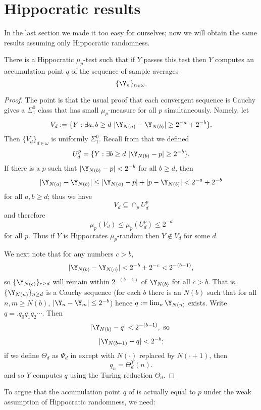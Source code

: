 \section{Hippocratic results}

In the last section we made it too easy for ourselves; now we will obtain the same results assuming only Hippocratic randomness. 

\begin{theorem}\label{Hippo}
There is a Hippocratic $\mu_p$-test such that if $Y$ passes this test then $Y$ computes an accumulation point $q$ of the sequence of sample averages 
\[
\{\Y_n\}_{n\in\omega}.
\] 
\end{theorem}

\begin{proof}
The point is that the usual proof that each convergent sequence is Cauchy gives a $\Sigma^0_1$ class that has small $\mu_p$-measure for all $p$ simultaneously. Namely, let
\[
V_d:=\{Y: \exists a,b\ge d\,\,|\Y_{N(a)}-\Y_{N(b)}|\ge 2^{-a}+ 2^{-b}\}.
\]
Then $\{V_d\}_{d\in\omega}$ is uniformly $\Sigma^0_1$. Recall from  that we defined
\[
U^{p}_d=\{Y:\exists b\ge d\,\, |\Y_{N(b)}-p|\ge 2^{-b}\}.
\]
If there is a $p$ such that $|\Y_{N(b)}-p|<2^{-b}$ for all $b\ge d$, then 
\[
|\Y_{N(a)}-\Y_{N(b)}|\le |\Y_{N(a)}-p|+|p-\Y_{N(b)}|< 2^{-a}+2^{-b}
\]
for all $a,b\ge d$; thus we have 
\[
V_d\subseteq \cap_{p} U^{p}_d
\]
and therefore 
\[
\mu_p(V_d)\le\mu_p(U^{p}_d)\le 2^{-d}
\]
for all $p$. 
 Thus if $Y$ is Hippocrates $\mu_p$-random then $Y\not\in V_d$ for some $d$. %

We next note that for any numbers $c> b$, 
\[
|\Y_{N(b)} - \Y_{N(c)}| < 2^{-b}+2^{-c} < 2^{-(b-1)},
\]
so $\{\Y_{N(c)}\}_{c\ge d}$ will remain within $2^{-(b-1)}$ of $\Y_{N(b)}$ for all $c>b$. That is, $\{\Y_{N(n)}\}_{n\ge d}$ is a Cauchy sequence (for each $b$ there is an $N(b)$ such that for all $n,m\ge N(b)$, $|\Y_n-\Y_m|\le 2^{-b}$) hence $q:=\lim_n \Y_{N(n)}$ exists. Write $q=.q_0q_1q_2\cdots$. Then
\[
|\Y_{N(b)}-q| <  2^{-(b-1)}, \text{ so }
\]
\[
|\Y_{N(b+1)}-q| <  2^{-b};
\]
if we define $\Theta_d$ as $\Psi_d$ in  except with $N(\cdot)$ replaced by $N(\cdot+1)$, then
\[
q_n = \Theta_d^Y(n).
\] 
and so $Y$ computes $q$ using the Turing reduction $\Theta_d$. 
\end{proof}


To argue that the accumulation point $q$ of  is actually equal to $p$ under the weak assumption of Hippocratic randomness, we need: 
